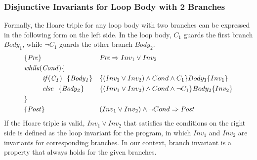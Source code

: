 \vspace{-0.2cm}
\subsubsection{Disjunctive Invariants for Loop Body with 2 Branches}
Formally, the Hoare triple for any loop body with two branches can be expressed in the following form on the left side.
In the loop body, $\mathit{C_1}$ guards the first branch $\mathit{Body_1}$, while $\mathit{\neg C_1}$ guards the other branch $\mathit{Body_2}$.
\begin{align}
&\{\mathit{Pre}\} && \emph{Pre} \Rightarrow \emph{$Inv_1$} \vee \emph{$Inv_2$} \label{ext:inv:pre}\\
&\mathit{while} (\mathit{Cond}) \{ && \\
&~~~~~~~~\mathit{if} (\mathit{C_1}) ~~\{ \mathit{Body_1} \} && \{(\emph{$Inv_1$} \vee \emph{$Inv_2$}) \wedge Cond \wedge C_1\} Body_1 \{\emph{$Inv_1$}\} \label{ext:inv:loop:b1}\\
&~~~~~~~~\mathit{else} ~~\{ \mathit{Body_2} \} && \{(\emph{$Inv_1$} \vee \emph{$Inv_2$}) \wedge Cond \wedge \neg C_1\} Body_2 \{\emph{$Inv_2$}\} \label{ext:inv:loop:b2}\\
&\} && \\
&\{\mathit{Post}\} && (\emph{$Inv_1$} \vee \emph{$Inv_2$}) \wedge \neg Cond \Rightarrow \emph{Post} \label{ext:inv:post}
\end{align}
If the Hoare triple is valid, $Inv_1 \vee Inv_2$ that satisfies the conditions on the right side is defined as the loop invariant for the program, 
in which $Inv_1$ and $Inv_2$ are invariants for corresponding branches.
In our context, branch invariant is a property that always holds for the given branches.


